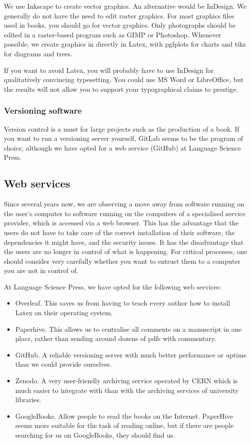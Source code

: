 \documentclass[guidelines,nonflat,modfonts] {langsci/langscibook}
\begin{document}
We use Inkscape to create vector graphics. An alternative would be InDesign. We generally do not have the need to edit raster graphics. For most graphics files used in books, you should go for vector graphics. Only photographs should be edited in a raster-based program such as GIMP or Photoshop. Whenever possible, we create graphics in directly in Latex, with pgfplots for charts and tikz for diagrams and trees. 

If you want to avoid Latex, you will probably have to use InDesign for qualitatively convincing typesetting. You could use MS Word or LibreOffice, but the results will not allow you to support your typographical claims to prestige.


\subsubsection{Versioning software}
Version control is a must for large projects such as the production of a book. If you want to run a versioning server yourself, GitLab seems to be the program of choice, although we have opted for a web service (GitHub) at Language Science Press. 

\subsection{Web services}
Since several years now, we are observing a move away from software running on the user's computer to software running on the computers of a specialised service provider, which is accessed via a web browser. This has the advantage that the users do not have to take care of the correct installation of their software, the dependencies it might have, and the security issues. It has the disadvantage that the users are no longer in control of what is happening. For critical processes, one should consider very carefully whether you want to entrust them to a computer you are not in control of. 

At Language Science Press, we have opted for the following web services: 

\begin{itemize}
 \item Overleaf. This saves us from having to teach every author how to install Latex on their operating system. 
 \item Paperhive. This allows us to centralise all comments on a manuscript in one place, rather than sending around dozens of pdfs with commentary. 
 \item GitHub. A reliable versioning server with much better performance or uptime than we could provide ourselves. 
 \item Zenodo. A very user-friendly archiving service operated by CERN which is much easier to integrate with than with the archiving services of university libraries.
 \item GoogleBooks. Allow people to read the books on the Internet. PaperHive seems more suitable for the task of reading online, but if there are people searching for us on GoogleBooks, they should find us. 
\end{itemize}
\end{document}
